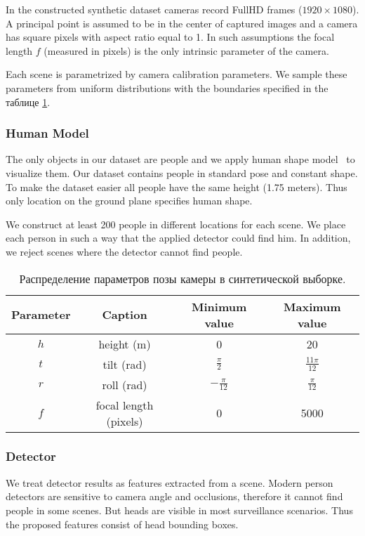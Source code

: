 In the constructed synthetic dataset cameras record FullHD frames ($1920\times1080$). A principal point is assumed to be in the center of captured images and a camera has square pixels with aspect ratio equal to 1. In such assumptions the focal length $f$ (measured in pixels) is the only intrinsic parameter of the camera.

Each scene is parametrized by camera calibration parameters. We sample these parameters from uniform distributions with the boundaries specified in the таблице \ref{tab:params}.

\subsubsection{Human Model}

\noindent The only objects in our dataset are people and we apply human shape model~\cite{pishchulin2015building} to visualize them. Our dataset contains people in standard pose and constant shape. To make the dataset easier all people have the same height (1.75 meters). Thus only location on the ground plane specifies human shape.

We construct at least 200 people in different locations for each scene. We place each person in such a way that the applied detector could find him. In addition, we reject scenes where the detector cannot find people.

\begin{table} [htbp]
	\centering
	\captionsetup{width=15cm}
	\caption{Распределение параметров позы камеры в синтетической выборке.}\label{tab:params}%
	\begin{tabular}{|c|c|c|c|}
		\hline
		Parameter & Caption & Minimum value & Maximum value\\
		\hline
		\hline
		$h$ & height (m) & 0 & 20 \\
		$t$ & tilt (rad) & $\frac{\pi}{2}$ & $\frac{11\pi}{12}$ \\
		$r$ & roll (rad) & $-\frac{\pi}{12}$ & $\frac{\pi}{12}$ \\
		$f$ & focal length (pixels) & 0 & 5000 \\
		\hline
	\end{tabular}
\end{table}

\subsubsection{Detector}

\noindent We treat detector results as features extracted from a scene.
Modern person detectors are sensitive to camera angle and occlusions, therefore it cannot find people in some scenes. But heads are visible in most surveillance scenarios. Thus the proposed features consist of head bounding boxes.

